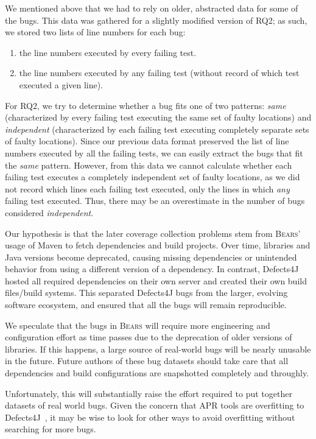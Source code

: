 \documentclass[10pt,journal,compsoc]{IEEEtran}
\newcommand\bears{\textsc{Bears}\xspace}
\begin{document}
We mentioned above that we had to rely on older, abstracted data for some of the bugs.
This data was gathered for a slightly modified version of RQ2; as such, we stored two lists of line numbers for each bug: 
\begin{enumerate}
  \item the line numbers executed by every failing test.
  \item the line numbers executed by any failing test (without record of which test executed a given line).
\end{enumerate}
For RQ2, we try to determine whether a bug fits one of two patterns: 
\textit{same} (characterized by every failing test executing the same set of faulty locations)
and \textit{independent} (characterized by each failing test executing completely separate sets of faulty locations).
Since our previous data format preserved the list of line numbers executed by all the failing tests, 
we can easily extract the bugs that fit the \textit{same} pattern.
However, from this data we cannot calculate whether each failing test executes a completely independent set of faulty locations,
as we did not record which lines each failing test executed, only the lines in which \textit{any} failing test executed.
Thus, there may be an overestimate in the number of bugs considered \textit{independent}.

Our hypothesis is that the later coverage collection problems stem from \bears{}' usage of Maven to fetch dependencies and build projects.
Over time, libraries and Java versions become deprecated, causing missing dependencies or unintended behavior from using 
a different version of a dependency.
In contrast, Defects4J hosted all required dependencies on their own server and created their own build files/build systems.
This separated Defects4J bugs from the larger, evolving software ecosystem, and ensured that all the bugs will remain reproducible.

We speculate that the bugs in \bears will require more engineering and configuration effort as time passes 
due to the deprecation of older versions of libraries.
If this happens, a large source of real-world bugs 
will be nearly unusable in the future.
Future authors of these bug datasets should take care that all dependencies and build configurations are snapshotted
completely and throughly. 

Unfortunately, this will substantially raise the effort required to put together datasets of real world bugs.
Given the concern that APR tools are overfitting to Defects4J~\cite{durieux-repair-them-all},
it may be wise to look for other ways to avoid overfitting without searching for more bugs.
\end{document}
